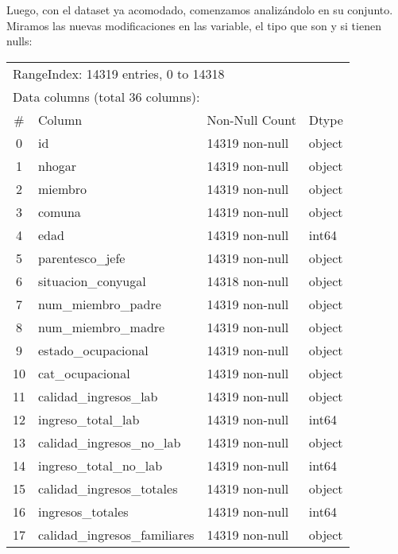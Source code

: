 \documentclass[a4paper]{article}
\begin{document}
    Luego, con el dataset ya acomodado, comenzamos analizándolo en su conjunto.    Miramos las nuevas modificaciones en las variable, el tipo que son y si tienen nulls:
    \begin{table}[H]\begin{center}
    \begin{tabular}{clll}
        \multicolumn{4}{l}{RangeIndex: 14319 entries, 0 to 14318} \\
        \multicolumn{4}{l}{Data columns (total 36 columns):} \\
        \#  & Column                     & Non-Null Count & Dtype \\ \hline
        0 & id                           & 14319 non-null & object \\
        1 & nhogar                       & 14319 non-null & object \\
        2 &  miembro                     & 14319 non-null & object \\ 
        3 &  comuna                      & 14319 non-null & object  \\
        4 &  edad                        & 14319 non-null & int64   \\
        5 &  parentesco\_jefe             & 14319 non-null & object  \\
        6 &  situacion\_conyugal          & 14318 non-null & object  \\
        7 &  num\_miembro\_padre           & 14319 non-null & object  \\
        8 &  num\_miembro\_madre           & 14319 non-null & object  \\
        9 &  estado\_ocupacional          & 14319 non-null & object  \\
        10 &  cat\_ocupacional            & 14319 non-null & object  \\
        11 & calidad\_ingresos\_lab        & 14319 non-null & object  \\
        12 & ingreso\_total\_lab           & 14319 non-null & int64   \\
        13 & calidad\_ingresos\_no\_lab     & 14319 non-null & object  \\
        14 & ingreso\_total\_no\_lab        & 14319 non-null & int64   \\
        15 & calidad\_ingresos\_totales    & 14319 non-null & object  \\
        16 & ingresos\_totales            & 14319 non-null & int64   \\
        17 & calidad\_ingresos\_familiares & 14319 non-null & object  \\

\end{tabular}
\end{center}
\end{table}
\end{document}
